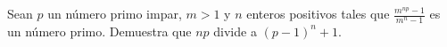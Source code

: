 Sean $p$ un número primo impar, $m \gt 1$ y $n$ enteros positivos tales que $\frac{m^{np}-1}{m^n-1}$ es un número primo. Demuestra que $np$ divide a $(p - 1)^n + 1$.